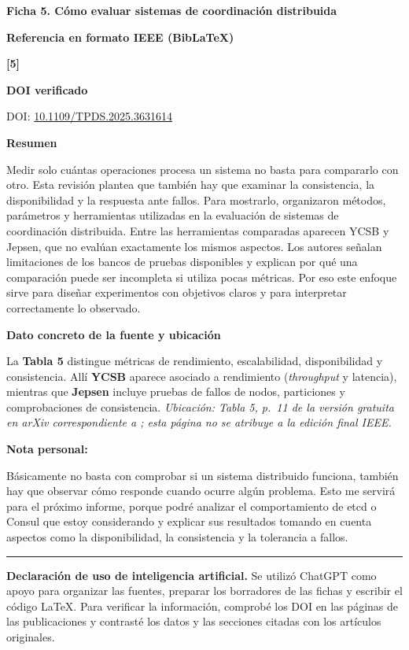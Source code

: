 \documentclass[11pt,letterpaper]{article}
\newcommand{\ficha}[2]{\begin{center}\large\bfseries Ficha #1. #2\end{center}\vspace{0.4em}}
\newcommand{\campo}[1]{\par\vspace{0.45em}\noindent\textbf{#1}\par}
\begin{document}
\clearpage
\ficha{5}{Cómo evaluar sistemas de coordinación distribuida}
\campo{Referencia en formato IEEE (BibLaTeX)}
\textbf{[5]}\enspace {}
\campo{DOI verificado}
DOI: \href{https://doi.org/10.1109/TPDS.2025.3631614}{10.1109/TPDS.2025.3631614}
\campo{Resumen}
Medir solo cuántas operaciones procesa un sistema no basta para compararlo con otro. Esta revisión plantea que también hay que examinar la consistencia, la disponibilidad y la respuesta ante fallos. Para mostrarlo, organizaron métodos, parámetros y herramientas utilizadas en la evaluación de sistemas de coordinación distribuida. Entre las herramientas comparadas aparecen YCSB y Jepsen, que no evalúan exactamente los mismos aspectos. Los autores señalan limitaciones de los bancos de pruebas disponibles y explican por qué una comparación puede ser incompleta si utiliza pocas métricas. Por eso este enfoque sirve para diseñar experimentos con objetivos claros y para interpretar correctamente lo observado.
\campo{Dato concreto de la fuente y ubicación}
La \textbf{Tabla 5} distingue métricas de rendimiento, escalabilidad, disponibilidad y consistencia. Allí \textbf{YCSB} aparece asociado a rendimiento (\textit{throughput} y latencia), mientras que \textbf{Jepsen} incluye pruebas de fallos de nodos, particiones y comprobaciones de consistencia. \textit{Ubicación: Tabla 5, p.~11 de la versión gratuita en arXiv correspondiente a \cite{turkkan2026evaluate}; esta página no se atribuye a la edición final IEEE.}
\campo{Nota personal:}
Básicamente no basta con comprobar si un sistema distribuido funciona, también hay que observar cómo responde cuando ocurre algún problema. Esto me servirá para el próximo informe, porque podré analizar el comportamiento de etcd o Consul que estoy considerando y explicar sus resultados tomando en cuenta aspectos como la disponibilidad, la consistencia y la tolerancia a fallos.

\vfill
\noindent\rule{\linewidth}{0.4pt}
\textbf{Declaración de uso de inteligencia artificial.} Se utilizó ChatGPT como apoyo para organizar las fuentes, preparar los borradores de las fichas y escribir el código LaTeX. Para verificar la información, comprobé los DOI en las páginas de las publicaciones y contrasté los datos y las secciones citadas con los artículos originales.
\end{document}
